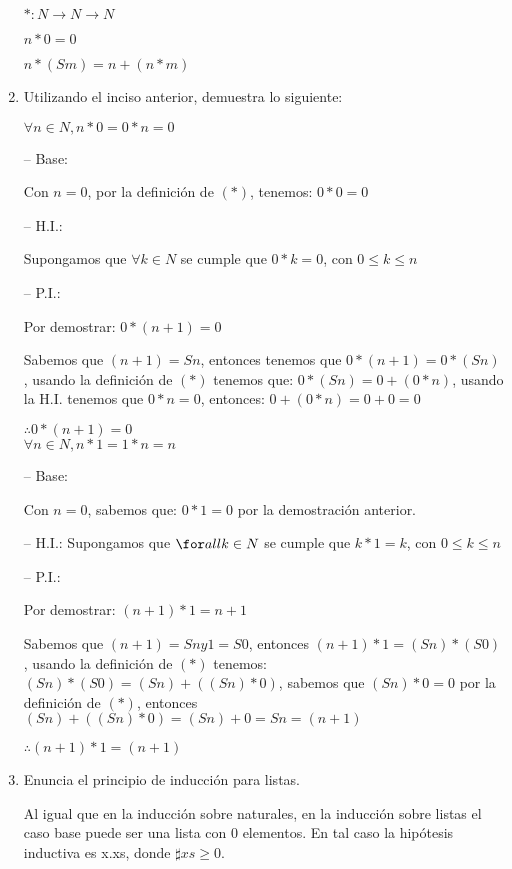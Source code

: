 \documentclass{article}
\begin{document}
\begin{enumerate}
$ \ast : N \rightarrow N \rightarrow N$

$n \ast 0 = 0$ 

$n \ast (S m) = n + (n \ast m)$ \\

\item Utilizando el inciso anterior, demuestra lo siguiente:

$ \forall n \in N, n \ast 0 = 0 \ast n = 0$

– Base:

Con $n = 0$, por la definición de $(\ast)$, tenemos: $0 \ast 0 = 0$ \Checkmark

– H.I.:

Supongamos que $\forall k \in N$ se cumple que $0 \ast k = 0$, con $0 \leq k \leq n$ \Checkmark

– P.I.:

Por demostrar: $0 \ast (n + 1) = 0$

Sabemos que $(n + 1) = S n$, entonces tenemos que $0 \ast (n + 1) = 0 \ast (S n)$, usando la definición de
$(\ast)$ tenemos que:
$0 \ast (S n) = 0 + (0 \ast n)$, usando la H.I. tenemos que $0 \ast n = 0$, entonces:
$0 + (0 \ast n) = 0 + 0 = 0$

$ \therefore 0 \ast (n + 1) = 0$ \Checkmark \\

$\forall n \in N, n \ast 1 = 1 \ast n = n$

– Base:

Con $n = 0$, sabemos que: $0 \ast 1 = 0$ por la demostración anterior. \Checkmark

– H.I.:
Supongamos que $\for all k \in N$ se cumple que $k \ast 1 = k$, con $0 \leq k \leq n$ \Checkmark

– P.I.:

Por demostrar: $(n + 1) \ast 1 = n + 1$

Sabemos que $(n + 1) = S n y 1 = S 0$, entonces $(n + 1) \ast 1 = (S n) \ast (S 0)$, usando la definición de
$(\ast)$ tenemos:
$(S n) \ast (S 0) = (S n) + ((S n) \ast 0)$, 
sabemos que $(S n) \ast 0 = 0$ por la definición de $(\ast)$, entonces $(S n) + ((S n) \ast 0) = (S n) + 0 = S n = (n + 1)$

$\therefore (n + 1) \ast 1 = (n + 1)$ \Checkmark \\

\item Enuncia el principio de inducci\'on para listas.

Al igual que en la inducción sobre naturales, en la inducción sobre listas el caso base puede
ser una lista con 0 elementos. En tal caso la hipótesis inductiva es x.xs, donde $\sharp xs \geq 0$. 


\end{enumerate}
\end{document}
